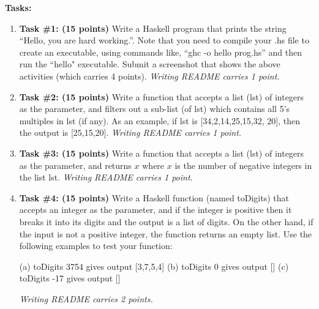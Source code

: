 \documentclass[paper=letter, fontsize=11pt]{scrartcl} %
\begin{document}
    \textbf{Tasks:}
    \begin{enumerate}

        \item \textbf{Task \#1: (15 points)} Write a Haskell program that prints the string ``Hello, you are hard working.''. 
Note that you need to compile your .hs file to create an executable, using commands like, ``ghc -o hello  prog.hs'' and then run the ``hello" executable.
Submit a screenshot that shows the above activities (which carries 4 points). \emph{Writing README carries 1 point.}

        \item \textbf{Task \#2: (15 points)} Write a function that accepts a list (lst) of integers as the parameter, and 
filters out a sub-list (of lst) which contains all 5's multiples in lst (if any). 
As an example, if lst is [34,2,14,25,15,32, 20], then the output is [25,15,20]. \emph{Writing README carries 1 point.}

        \item \textbf{Task \#3: (15 points)} Write a function that accepts a list (lst) of integers as the parameter, and 
returns $x$ where $x$ is the number of negative integers in the list lst. \emph{Writing README carries 1 point.}
        
	\item \textbf{Task \#4: (15 points)} Write a Haskell function (named toDigits) that accepts an integer as the parameter, and if the integer is positive then it breaks it into its digits and the output is a list of digits. On the other hand, if the input is not a positive integer, the function returns an empty list. Use the following examples to test your function: 

(a) toDigits 3754 gives output [3,7,5,4]
(b) toDigits 0 gives output []
(c) toDigits -17 gives output []

\emph{Writing README carries 2 points.}

    
    \end{enumerate}
\end{document}
